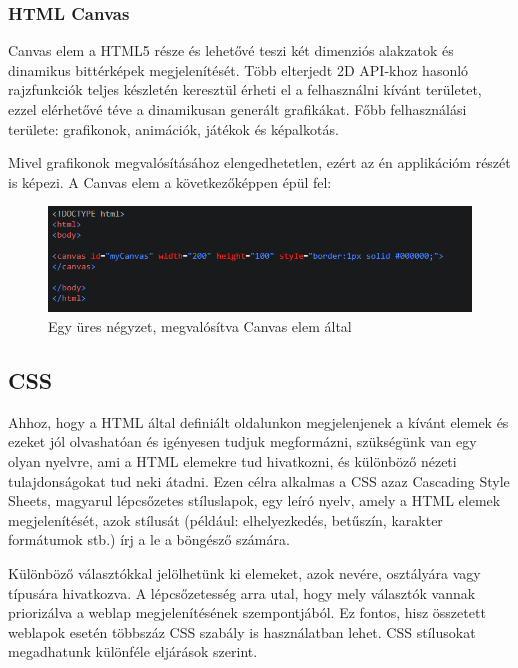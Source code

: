 \subsubsection{HTML Canvas} 

Canvas elem a HTML5 része és lehetővé teszi két dimenziós alakzatok és dinamikus bittérképek megjelenítését. Több elterjedt 2D API-khoz hasonló rajzfunkciók teljes készletén keresztül érheti el a felhasználni kívánt területet, ezzel elérhetővé téve a dinamikusan generált grafikákat. Főbb felhasználási területe: grafikonok, animációk, játékok és képalkotás.

Mivel grafikonok megvalósításához elengedhetetlen, ezért az én applikációm részét is képezi. A Canvas elem a következőképpen épül fel:
\begin{figure}[h]
\centering
\includegraphics[scale=0.7]{images/canvasExample.png}
\caption{Egy üres négyzet, megvalósítva Canvas elem által}
\end{figure}

\subsection{CSS}

Ahhoz, hogy a HTML által definiált oldalunkon megjelenjenek a kívánt elemek és ezeket jól olvashatóan és igényesen tudjuk megformázni, szükségünk van egy olyan nyelvre, ami a HTML elemekre tud hivatkozni, és különböző nézeti tulajdonságokat tud neki átadni. Ezen célra alkalmas a CSS azaz Cascading Style Sheets, magyarul lépcsőzetes stíluslapok, egy leíró nyelv, amely a HTML elemek megjelenítését, azok stílusát (például: elhelyezkedés, betűszín, karakter formátumok stb.) írj a le a böngésző számára. 

	Különböző választókkal jelölhetünk ki elemeket, azok nevére, osztályára vagy típusára hivatkozva. A lépcsőzetesség arra utal, hogy mely választók vannak priorizálva a weblap megjelenítésének szempontjából. Ez fontos, hisz összetett weblapok esetén többszáz CSS szabály is használatban lehet. \newline
	CSS stílusokat megadhatunk különféle eljárások szerint.  \\

